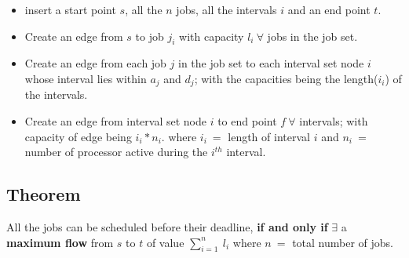 \documentclass[pdftex,a4paper,12pt]{report}
\begin{document}
\begin{itemize}
\item insert a start point $s$, all the $n$ jobs, all the intervals $i$ and an end point $t$.
\item Create an edge from $s$ to job $j_i$ with capacity $l_i\ \forall$ jobs in the job set.
\item Create an edge from each job $j$ in the job set to each interval set node $i$ whose interval lies within $a_j$ and $d_j$; with the capacities being the length($i_i$) of the intervals. 
\item Create an edge from interval set node $i$ to end point $f\ \forall$ intervals; with capacity of edge being $i_i*n_i$. where $i_i\ =$ length of interval $i$ and $n_i\ =$ number of processor active during the $i^{th}$ interval.
\end{itemize}

        
\subsection{Theorem}
\begin{center}
All the jobs can be scheduled before their deadline, \textbf{if and only if} $\exists$ a \textbf{maximum flow} from $s$ to $t$ of value $\sum_{i=1}^{n}\ l_i$ where $n\ =$ total number of jobs.
\end{center}
\end{document}
